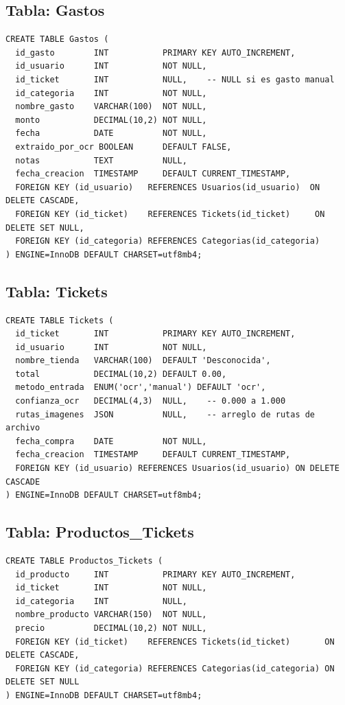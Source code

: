 \subsection{Tabla: Gastos}

\begin{lstlisting}[style=sql, caption={DDL de la tabla Gastos}]
CREATE TABLE Gastos (
  id_gasto        INT           PRIMARY KEY AUTO_INCREMENT,
  id_usuario      INT           NOT NULL,
  id_ticket       INT           NULL,    -- NULL si es gasto manual
  id_categoria    INT           NOT NULL,
  nombre_gasto    VARCHAR(100)  NOT NULL,
  monto           DECIMAL(10,2) NOT NULL,
  fecha           DATE          NOT NULL,
  extraido_por_ocr BOOLEAN      DEFAULT FALSE,
  notas           TEXT          NULL,
  fecha_creacion  TIMESTAMP     DEFAULT CURRENT_TIMESTAMP,
  FOREIGN KEY (id_usuario)   REFERENCES Usuarios(id_usuario)  ON DELETE CASCADE,
  FOREIGN KEY (id_ticket)    REFERENCES Tickets(id_ticket)     ON DELETE SET NULL,
  FOREIGN KEY (id_categoria) REFERENCES Categorias(id_categoria)
) ENGINE=InnoDB DEFAULT CHARSET=utf8mb4;
\end{lstlisting}

\subsection{Tabla: Tickets}

\begin{lstlisting}[style=sql, caption={DDL de la tabla Tickets}]
CREATE TABLE Tickets (
  id_ticket       INT           PRIMARY KEY AUTO_INCREMENT,
  id_usuario      INT           NOT NULL,
  nombre_tienda   VARCHAR(100)  DEFAULT 'Desconocida',
  total           DECIMAL(10,2) DEFAULT 0.00,
  metodo_entrada  ENUM('ocr','manual') DEFAULT 'ocr',
  confianza_ocr   DECIMAL(4,3)  NULL,    -- 0.000 a 1.000
  rutas_imagenes  JSON          NULL,    -- arreglo de rutas de archivo
  fecha_compra    DATE          NOT NULL,
  fecha_creacion  TIMESTAMP     DEFAULT CURRENT_TIMESTAMP,
  FOREIGN KEY (id_usuario) REFERENCES Usuarios(id_usuario) ON DELETE CASCADE
) ENGINE=InnoDB DEFAULT CHARSET=utf8mb4;
\end{lstlisting}

\subsection{Tabla: Productos\_Tickets}

\begin{lstlisting}[style=sql, caption={DDL de la tabla Productos\_Tickets}]
CREATE TABLE Productos_Tickets (
  id_producto     INT           PRIMARY KEY AUTO_INCREMENT,
  id_ticket       INT           NOT NULL,
  id_categoria    INT           NULL,
  nombre_producto VARCHAR(150)  NOT NULL,
  precio          DECIMAL(10,2) NOT NULL,
  FOREIGN KEY (id_ticket)    REFERENCES Tickets(id_ticket)       ON DELETE CASCADE,
  FOREIGN KEY (id_categoria) REFERENCES Categorias(id_categoria) ON DELETE SET NULL
) ENGINE=InnoDB DEFAULT CHARSET=utf8mb4;
\end{lstlisting}

